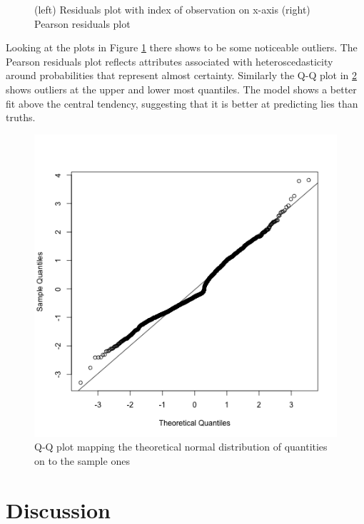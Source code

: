 \documentclass[man, floatsintext]{apa7}
\begin{document}
\begin{figure}[H]
	\caption{(left) Residuals plot with index of observation on x-axis (right) Pearson residuals plot}
	\label{fig:Residuals}
\end{figure}

Looking at the plots in Figure \ref{fig:Residuals} there shows to be some noticeable outliers. The Pearson residuals plot reflects attributes associated with heteroscedasticity around probabilities that represent almost certainty. Similarly the Q-Q plot in \ref{fig:qqline} shows outliers at the upper and lower most quantiles. The model shows a better fit above the central tendency, suggesting that it is better at predicting lies than truths.

\begin{figure}[H]
	\centering
	\includegraphics[width=0.5\linewidth]{../plots/R/qqline}
	\caption{Q-Q plot mapping the theoretical normal distribution of quantities on to the sample ones}
	\label{fig:qqline}
\end{figure}

\section{Discussion}



\end{document}
